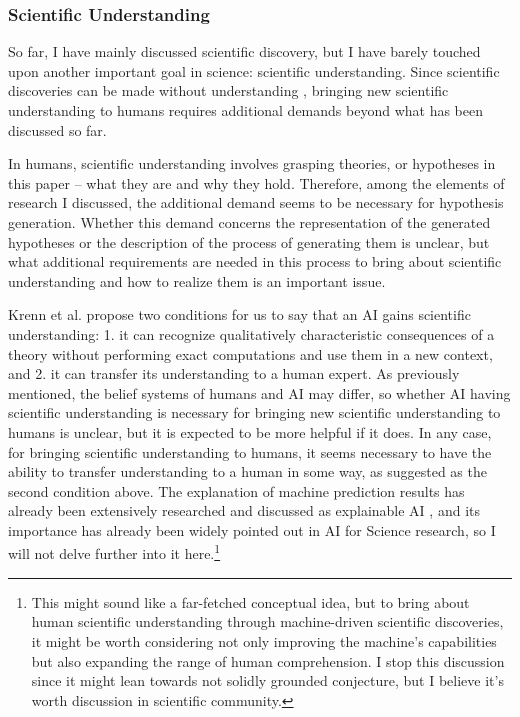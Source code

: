 
\subsubsection{Scientific Understanding}
So far, I have mainly discussed scientific discovery, but I have barely touched upon another important goal in science: scientific understanding. Since scientific discoveries can be made without understanding \cite{krenn2022scientific}, bringing new scientific understanding to humans requires additional demands beyond what has been discussed so far.

In humans, scientific understanding involves grasping theories, or hypotheses in this paper – what they are and why they hold. Therefore, among the elements of research I discussed, the additional demand seems to be necessary for hypothesis generation. Whether this demand concerns the representation of the generated hypotheses or the description of the process of generating them is unclear, but what additional requirements are needed in this process to bring about scientific understanding and how to realize them is an important issue.

Krenn et al. propose two conditions for us to say that an AI gains scientific understanding: 1. it can recognize qualitatively characteristic consequences of a theory without performing exact computations and use them in a new context, and 2. it can transfer its understanding to a human expert. As previously mentioned, the belief systems of humans and AI may differ, so whether AI having scientific understanding is necessary for bringing new scientific understanding to humans is unclear, but it is expected to be more helpful if it does. In any case, for bringing scientific understanding to humans, it seems necessary to have the ability to transfer understanding to a human in some way, as suggested as the second condition above. The explanation of machine prediction results has already been extensively researched and discussed as explainable AI \cite{arrieta2020explainable}, and its importance has already been widely pointed out in AI for Science research, so I will not delve further into it here.\footnote{
This might sound like a far-fetched conceptual idea, but to bring about human scientific understanding through machine-driven scientific discoveries, it might be worth considering not only improving the machine's capabilities but also expanding the range of human comprehension. I stop this discussion since it might lean towards not solidly grounded conjecture, but I believe it's worth discussion in scientific community.
}


